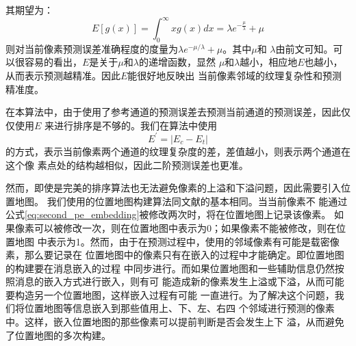 其期望为：
\begin{equation}
  E[g(x)]=\int_0^{\infty}xg(x)dx=\lambda e^{-\frac{\mu}{\lambda}}+\mu
\end{equation}
则对当前像素预测误差准确程度的度量为$\lambda e^{-\mu/\lambda}+\mu$。其中$\mu$和
$\lambda$由前文可知。可以很容易的看出，$E$是关于$\mu$和$\lambda$的递增函数，显然
$\mu$和$\lambda$越小，相应地$E$也越小，从而表示预测越精准。因此$E$能很好地反映出
当前像素邻域的纹理复杂性和预测精准度。
\par
在本算法中，由于使用了参考通道的预测误差去预测当前通道的预测误差，因此仅仅使用$E$
来进行排序是不够的。我们在算法中使用
\begin{equation}
  E^{'}=|E_c-E_t|
  \label{eq:sorting_param}
\end{equation}
的方式，表示当前像素两个通道的纹理复杂度的差，差值越小，则表示两个通道在这个像
素点处的结构越相似，因此二阶预测误差也更准。
\par
然而，即使是完美的排序算法也无法避免像素的上溢和下溢问题，因此需要引入位置地图。
我们使用的位置地图构建算法同文献\cite{li2013reversible}的基本相同。当当前像素不
能通过公式\ref{eq:second_pe_embedding}被修改两次时，将在位置地图上记录该像素。
如果像素可以被修改一次，则在位置地图中表示为0；如果像素不能被修改，则在位置地图
中表示为1。然而，由于在预测过程中，使用的邻域像素有可能是载密像素，那么要记录在
位置地图中的像素只有在嵌入的过程中才能确定。即位置地图的构建要在消息嵌入的过程
中同步进行。而如果位置地图和一些辅助信息仍然按照消息的嵌入方式进行嵌入，则有可
能造成新的像素发生上溢或下溢，从而可能要构造另一个位置地图，这样嵌入过程有可能
一直进行。为了解决这个问题，我们将位置地图等信息嵌入到那些值用上、下、左、右四
个邻域进行预测的像素中。这样，嵌入位置地图的那些像素可以提前判断是否会发生上下
溢，从而避免了位置地图的多次构建。



